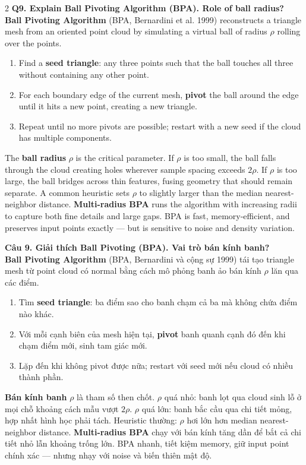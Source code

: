 \begin{paracol}{2}
\textbf{Q9. Explain Ball Pivoting Algorithm (BPA). Role of ball radius?}\\
\textbf{Ball Pivoting Algorithm} (BPA, Bernardini et al. 1999) reconstructs a triangle mesh from an oriented point cloud by simulating a virtual ball of radius $\rho$ rolling over the points.
\begin{enumerate}[leftmargin=*,nosep]
\item Find a \textbf{seed triangle}: any three points such that the ball touches all three without containing any other point.
\item For each boundary edge of the current mesh, \textbf{pivot} the ball around the edge until it hits a new point, creating a new triangle.
\item Repeat until no more pivots are possible; restart with a new seed if the cloud has multiple components.
\end{enumerate}
The \textbf{ball radius} $\rho$ is the critical parameter. If $\rho$ is too small, the ball falls through the cloud creating holes wherever sample spacing exceeds $2\rho$. If $\rho$ is too large, the ball bridges across thin features, fusing geometry that should remain separate. A common heuristic sets $\rho$ to slightly larger than the median nearest-neighbor distance. \textbf{Multi-radius BPA} runs the algorithm with increasing radii to capture both fine details and large gaps. BPA is fast, memory-efficient, and preserves input points exactly — but is sensitive to noise and density variation.

\switchcolumn

\textbf{Câu 9. Giải thích Ball Pivoting (BPA). Vai trò bán kính banh?}\\
\textbf{Ball Pivoting Algorithm} (BPA, Bernardini và cộng sự 1999) tái tạo triangle mesh từ point cloud có normal bằng cách mô phỏng banh ảo bán kính $\rho$ lăn qua các điểm.
\begin{enumerate}[leftmargin=*,nosep]
\item Tìm \textbf{seed triangle}: ba điểm sao cho banh chạm cả ba mà không chứa điểm nào khác.
\item Với mỗi cạnh biên của mesh hiện tại, \textbf{pivot} banh quanh cạnh đó đến khi chạm điểm mới, sinh tam giác mới.
\item Lặp đến khi không pivot được nữa; restart với seed mới nếu cloud có nhiều thành phần.
\end{enumerate}
\textbf{Bán kính banh} $\rho$ là tham số then chốt. $\rho$ quá nhỏ: banh lọt qua cloud sinh lỗ ở mọi chỗ khoảng cách mẫu vượt $2\rho$. $\rho$ quá lớn: banh bắc cầu qua chi tiết mỏng, hợp nhất hình học phải tách. Heuristic thường: $\rho$ hơi lớn hơn median nearest-neighbor distance. \textbf{Multi-radius BPA} chạy với bán kính tăng dần để bắt cả chi tiết nhỏ lẫn khoảng trống lớn. BPA nhanh, tiết kiệm memory, giữ input point chính xác — nhưng nhạy với noise và biến thiên mật độ.


\end{paracol}
